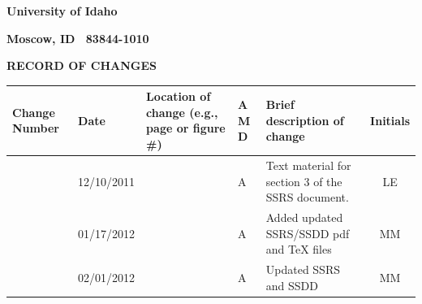 \documentclass[twoside,letterpaper]{article}
\begin{document}
{\centering\bfseries
University of Idaho
\par}

{\centering\bfseries
Moscow, ID \ 83844-1010
\par}



\bigskip





{\centering\bfseries RECORD OF CHANGES \par}


\bigskip

\begin{flushleft}
\tablehead{}
\begin{supertabular}[c]{|m{0.75in}|m{1.0in}|m{1.5in}|m{0.25in}|m{2in}|c|}
\hline

\centering \bfseries Change
\centering \bfseries Number
&

\centering \bfseries Date
\par
&

\centering \bfseries Location of change\newline
\centering \bfseries(e.g., page or figure \#)
&

\centering \bfseries A\newline
\centering \bfseries M\newline
\centering \bfseries D  
&

\centering \bfseries Brief description\newline
\centering \bfseries of change
&
\bfseries Initials
\\\hline

& 12/10/2011
& ~
& \centering A
& Text material for section 3 of the SSRS document.
& LE

\\\hline
{}
& 01/17/2012
& ~
& \centering A
& Added updated SSRS/SSDD pdf and TeX files
& MM

\\\hline
{}
& 02/01/2012
& ~
& \centering A
& Updated SSRS and SSDD
& MM

\\\hline
\end{supertabular}
\end{flushleft}
\end{document}
